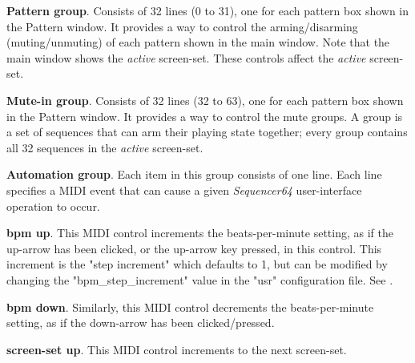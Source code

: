    \begin{enumber}
      \item \textbf{Pattern group}.
         Consists of 32 lines (0 to 31), one for each
         pattern box shown in the Pattern window.
         It provides a way to control the arming/disarming (muting/unmuting) of
         each pattern shown in the main window.  Note that the main window
         shows the \textsl{active} screen-set.  These controls affect the
         \textsl{active} screen-set.
      \item \textbf{Mute-in group}.
         Consists of 32 lines (32 to 63), one for each
         pattern box shown in the Pattern window.
         It provides a way to control the mute groups.
         A group is a set of sequences that can arm their playing state
         together; every group contains all 32 sequences in the
         \textsl{active} screen-set.
      \item \textbf{Automation group}.
         Each item in this group consists of one line.  Each line
         specifies a MIDI event that can cause a given
         \textsl{Sequencer64} user-interface operation to occur.
         \begin{enumber}
            \item \textbf{bpm up}.
               This MIDI control increments the beats-per-minute setting, as if
               the up-arrow has been clicked, or the up-arrow key pressed, in
               this control.  This increment is the
               "step increment" which defaults to 1, but can be modified by
               changing the "bpm\_step\_increment" value in the "usr"
               configuration file.
               See .
            \item \textbf{bpm down}.
               Similarly, this MIDI control decrements the beats-per-minute
               setting, as if the down-arrow has been clicked/pressed.
            \item \textbf{screen-set up}.
               This MIDI control increments to the next screen-set. 

\end{enumber}
\end{enumber}
